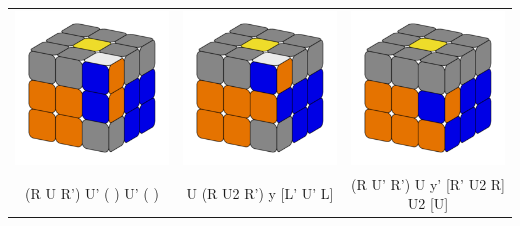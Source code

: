 \documentclass[12pt, a3paper]{article}
\newcommand{\scale}{1}
\begin{document}
\begin{center}
\begin{tabular}{c|c|c}
		\includegraphics[scale=\scale]{20r} & \includegraphics[scale=\scale]{21r} & \includegraphics[scale=\scale]{22r} \\
		(R U R') U' ( ) U' ( ) & U (R U2 R') y [L' U' L] & (R U' R') U y' [R' U2 R] U2 [U] \\
		\hline
	\end{tabular}
\end{center}
\end{document}
